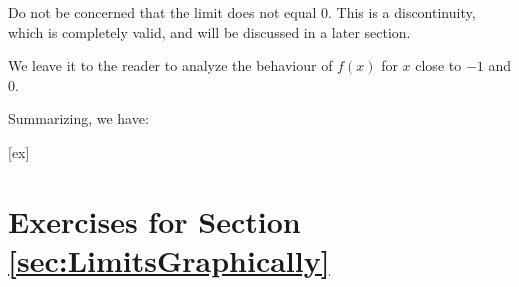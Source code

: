 Do not be concerned that the limit does not equal 0. This is a discontinuity, which is completely valid, and will be discussed in a later section.

We leave it to the reader to analyze the behaviour of $f(x)$ for $x$ close to $-1$ and $0$.
 
Summarizing, we have:


[ex]
\section*{Exercises for Section \ref{sec:LimitsGraphically}}

